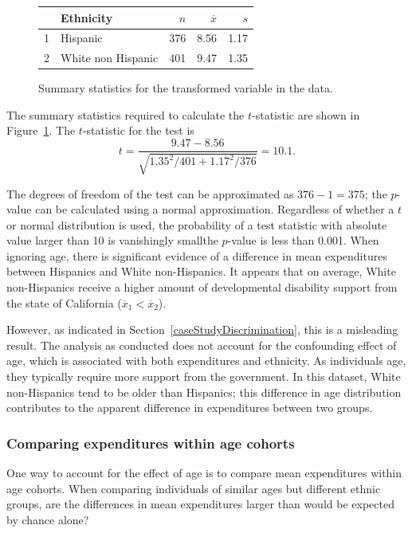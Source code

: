 \begin{figure}[ht]
\centering
\begin{tabular}{rlrrr} \hline
 & Ethnicity & $n$ & $\overline{x}$ & $s$ \\  \hline
1 & Hispanic & 376 & 8.56 & 1.17 \\ 
2 & White non Hispanic & 401 & 9.47 & 1.35 \\  \hline
\end{tabular}
\caption{Summary statistics for the transformed variable  in the  data.} 
\label{ddsLogExpenditureSummaryByEthnicity}
\end{figure}

The summary statistics required to calculate the $t$-statistic are shown in Figure~\ref{ddsLogExpenditureSummaryByEthnicity}. The $t$-statistic for the test is 
\[t = \frac{9.47 - 8.56}{\sqrt{1.35^2/401 + 1.17^2/376}} = 10.1.\]

\textD{\newpage}

The degrees of freedom of the test can be approximated as $376 - 1 = 375$; the $p$-value can be calculated using a normal approximation. Regardless of whether a $t$ or normal distribution is used, the probability of a test statistic with absolute value larger than 10 is vanishingly small\textemdash the $p$-value is less than 0.001. When ignoring age, there is significant evidence of a difference in mean expenditures between Hispanics and White non-Hispanics. It appears that on average, White non-Hispanics receive a higher amount of developmental disability support from the state of California ($\overline{x}_1 < \overline{x}_2$).

However, as indicated in Section~\ref{caseStudyDiscrimination}, this is a misleading result. The analysis as conducted does not account for the confounding effect of age, which is associated with both expenditures and ethnicity. As individuals age, they typically require more support from the government. In this dataset, White non-Hispanics tend to be older than Hispanics; this difference in age distribution contributes to the apparent difference in expenditures between two groups.

\subsubsection{Comparing expenditures within age cohorts}

One way to account for the effect of age is to compare mean expenditures within age cohorts. When comparing individuals of similar ages but different ethnic groups, are the differences in mean expenditures larger than would be expected by chance alone? 

